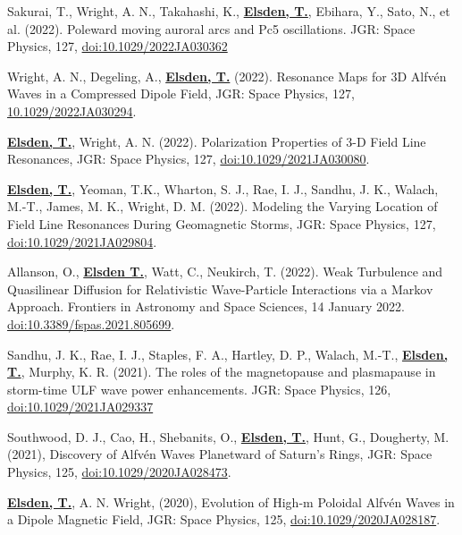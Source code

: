 \documentclass[11pt,a4paper]{article} %
\newcommand\vs{\vspace{-0.25cm}}
\begin{document}
\begin{etaremune}
\vs
\item Sakurai, T., Wright, A. N., Takahashi, K., \underline{\textbf{Elsden, T.}}, Ebihara, Y., Sato, N., et al. (2022). Poleward moving auroral arcs and Pc5 oscillations. JGR: Space Physics, 127, \href{https://doi.org/10.1029/2022JA030362}{doi:10.1029/2022JA030362}

\vs
\item Wright, A. N., Degeling, A., \underline{\textbf{Elsden, T.}} (2022). Resonance Maps for 3D Alfv\'{e}n Waves in a Compressed Dipole Field, JGR: Space Physics, 127, \href{https://doi.org/10.1029/2022JA030294}{10.1029/2022JA030294}. 

\vs
\item \underline{\textbf{Elsden, T.}}, Wright, A. N. (2022). Polarization Properties of 3-D Field Line Resonances, JGR: Space Physics, 127, \href{https://doi.org/10.1029/2021JA030080}{doi:10.1029/2021JA030080}.

\vs
\item \underline{\textbf{Elsden, T.}}, Yeoman, T.K., Wharton, S. J., Rae, I. J., Sandhu, J. K., Walach, M.-T., James, M. K., Wright, D. M. (2022). Modeling the Varying Location of Field Line Resonances During Geomagnetic Storms, JGR: Space Physics, 127, \href{https://doi.org/10.1029/2021JA029804}{doi:10.1029/2021JA029804}.

\vs
\item Allanson, O., \underline{\textbf{Elsden T.}}, Watt, C., Neukirch, T. (2022). Weak Turbulence and Quasilinear Diffusion for Relativistic Wave-Particle Interactions via a Markov Approach. Frontiers in Astronomy and Space Sciences, 14 January 2022. \href{https://doi.org/10.3389/fspas.2021.805699}{doi:10.3389/fspas.2021.805699}.  

\vs
\item Sandhu, J. K., Rae, I. J., Staples, F. A., Hartley, D. P., Walach, M.-T., \underline{\textbf{Elsden, T.}}, Murphy, K. R. (2021). The roles of the magnetopause and plasmapause in storm-time ULF wave power enhancements. JGR: Space Physics, 126, \href{https://doi.org/10.1029/2021JA029337}{doi:10.1029/2021JA029337}

\vs
\item Southwood, D. J., Cao, H., Shebanits, O., \underline{\textbf{Elsden, T.}}, Hunt, G., Dougherty, M. (2021), Discovery of Alfv\'{e}n Waves Planetward of Saturn's Rings, JGR: Space Physics, 125, {\href{https://doi.org/10.1029/2020JA028473}{doi:10.1029/2020JA028473}}.

\vs
\item \underline{\textbf{Elsden, T.}}, A. N. Wright, (2020), Evolution of High-m Poloidal Alfv\'{e}n Waves in a Dipole Magnetic Field, JGR: Space Physics, 125, {\href{https://doi.org/10.1029/2020JA028187}{doi:10.1029/2020JA028187}}.


\end{etaremune}
\end{document}
